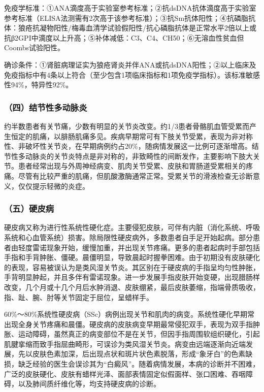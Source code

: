 免疫学标准：①ANA滴度高于实验室参考标准；②抗dsDNA抗体滴度高于实验室参考标准（ELISA法测需有2次高于该参考标准）；③抗Sm抗体阳性；④抗磷脂抗体：狼疮抗凝物阳性/梅毒血清学试验假阳性/抗心磷脂抗体是正常水平2倍以上或抗β2GPI中滴度以上升高；⑤补体减低：C3、C4、CH50；⑥无溶血性贫血但Coombs试验阳性。

确诊条件：①肾脏病理证实为狼疮肾炎并伴ANA或抗dsDNA阳性；②以上临床及免疫指标中有4条以上符合（至少包含1项临床指标和1项免疫学指标）。该标准敏感性94\%，特异性92\%。

\subsubsection{（四）结节性多动脉炎}

约半数患者有关节痛，少数有明显的关节炎改变。约1/3患者骨骼肌血管受累而产生恒定的肌痛，以腓肠肌痛多见。疾病早期常可有下肢关节受累，表现为非对称性、非破坏性关节炎，在早期病例约占20\%，随病情发展这一比例可逐渐增高。结节性多动脉炎的关节炎特点是非对称的，非致畸性的间断发作，主要影响下肢大关节。患者经常出现与外周神经病变、肌肉关节受累、皮肤和胃肠道受累相关的疼痛。尽管有比较严重的肌痛，但肌酸激酶通常正常。受累关节的滑液检查无诊断意义，仅仅提示轻微的炎症。

\subsubsection{（五）硬皮病}

硬皮病又称为进行性系统性硬化症。主要侵犯皮肤，可伴有内脏（消化系统、呼吸系统和心血管系统）损害。除局限性硬皮病外，多数患者自手足开始起病。部分患者由轻度雷诺现象开始，缓慢加重，并出现关节疼痛。更多的患者起病时手部包括手指和手背肿胀、僵硬。晨僵明显，导致晨起时握拳困难。由于初期没有皮肤硬化的表现，容易被误认为是类风湿关节炎。其区别在于硬皮病的手指呈均匀性肿胀，手背明显肿起，并且多伴有雷诺现象。进一步发展手指皮肤开始变硬，出现腊肠样改变，几个月或十几个月后水肿消退、皮肤绷紧，最后皮肤萎缩，指端骨质吸收，指、趾、腕、肘等关节固定于屈位，呈蜡样手。

60\%～80\%系统性硬皮病（SSc）病例出现关节和肌肉的病变。系统性硬化早期常出现全身关节疼痛和晨僵。硬皮病的皮肤病变早期最常侵犯双手，表现为双手指肿胀、运动障碍，虽然真正的病变部位不是在关节，但因手指周围软组织硬化，引起肌腱挛缩而致手指屈曲畸形，可误诊为类风湿关节炎。病变由远端逐渐向近端发展，先以皮肤色素加深，后出现点状和斑片状色素脱落，形成“象牙白”的色素缺损，缺乏经验的医生会误诊其为“白癜风”。随着病情发展，本病的诊断并不困难，广泛的皮肤硬化、皮肤有蜡样光泽、面部表情固定似假面样、张口困难、吞咽障碍，以及肺间质纤维化等，均支持硬皮病的诊断。

